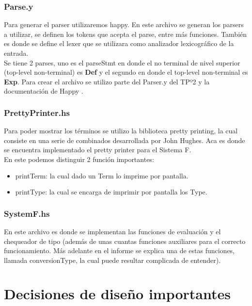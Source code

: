 \documentclass[12pt, titlepage, a4paper]{article}
\begin{document}
\subsubsection{Parse.y}
Para generar el parser utilizaremos happy. En este archivo se generan los parsers a utilizar, se definen los tokens que acepta el parse, 
entre más funciones. También es donde se define el lexer que se utilizara como analizador lexicográfico de la entrada. \\ 

Se tiene 2 parses, uno es el parseStmt en donde el no terminal de nivel superior (top-level non-terminal) es \textbf{Def} y el 
segundo en donde el top-level non-terminal es \textbf{Exp}. 
Para crear el archivo se utilizo parte del Parser.y del TPº2 \cite{tp2:lambdaCalculoSimpleTipado} y la documentación de Happy \cite{haskellHappy}. \\

\subsubsection{PrettyPrinter.hs}
Para poder mostrar los términos se utilizo la biblioteca pretty printing, la cual consiste en una serie de combinados desarrollada por John Hughes. Aca es 
donde se encuentra implementado el pretty printer para el Sistema F. \\
En este podemos distinguir 2 función importantes:
\begin{itemize}[label=$\bullet$]
  \item {printTerm: la cual dado un Term lo imprime por pantalla.}
  \item {printType: la cual se encarga de imprimir por pantalla los Type.}
\end{itemize}

\subsubsection{SystemF.hs}
En este archivo es donde se implementan las funciones de evaluación y el chequeador de tipo (además de unas cuantas funciones auxiliares 
para el correcto funcionamiento. Más adelante en el informe se explica una de estas funciones, llamada conversionType, la cual puede 
resultar complicada de entender).

\section{Decisiones de diseño importantes}
\end{document}
